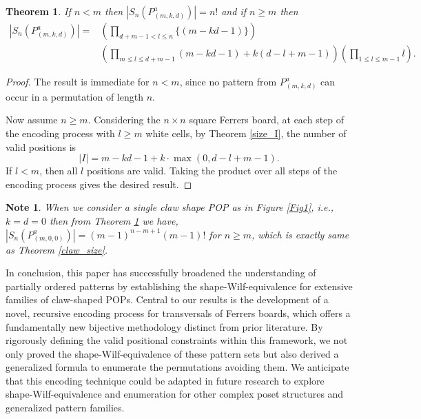 \documentclass[12pt, english, a4paper]{article}
\theoremstyle{plain}
\newtheorem{theorem}{Theorem}
\newtheorem{note}{Note}
\theoremstyle{definition}
\theoremstyle{remark}
\begin{document}
\begin{theorem}\label{claw_set_size}
If $n<m$ then $|S_n(P^a_{(m,k,d)})|=n!$ and if $n\geq m$ then
\begin{align*}
    |S_n(P^a_{(m,k,d)})|=& \left(\displaystyle \prod_{d+m-1< l\leq n}\{(m-kd-1)\}\right) \\
    & \displaystyle\left( \prod_{m\leq l \leq d+m-1}(m-kd-1)+k(d-l+m-1)\right ) \displaystyle\left(\prod_{1\leq l \leq m-1}l\right). 
\end{align*}
\end{theorem}
\begin{proof}
The result is immediate for $n<m$, since no pattern from 
$P^a_{(m,k,d)}$ can occur in a permutation of length $n$.

Now assume $n\ge m$. Considering the $n\times n$ square Ferrers board, at each step of the encoding process with $l\ge m$ white cells,  by Theorem \ref{size_I}, the number of valid positions is
\[
|I|=m-kd-1+k \cdot \max(0,d-l+m-1).
\]
If $l<m$, then all $l$ positions are valid. Taking the product over all steps of the encoding process gives the desired result.
\end{proof}


\begin{note}
 When we consider a single claw shape POP as in Figure \ref{Fig1}, i.e., $k=d=0$ then from Theorem \ref{claw_set_size} we have,  $|S_n(P^a_{(m,0,0)})|=(m-1)^{n-m+1}(m-1)!$  for $n \geq m$, which is exactly same as Theorem \ref{claw_size}.   
\end{note}

In conclusion, this paper has successfully broadened the understanding of partially ordered patterns by establishing the shape-Wilf-equivalence for extensive families of claw-shaped POPs. Central to our results is the development of a novel, recursive encoding process for transversals of Ferrers boards, which offers a fundamentally new bijective methodology distinct from prior literature. By rigorously defining the valid positional constraints within this framework, we not only proved the shape-Wilf-equivalence of these pattern sets but also derived a generalized formula to enumerate the permutations avoiding them. We anticipate that this encoding technique could be adapted in future research to explore shape-Wilf-equivalence and enumeration for other complex poset structures and generalized pattern families.


\end{document}
